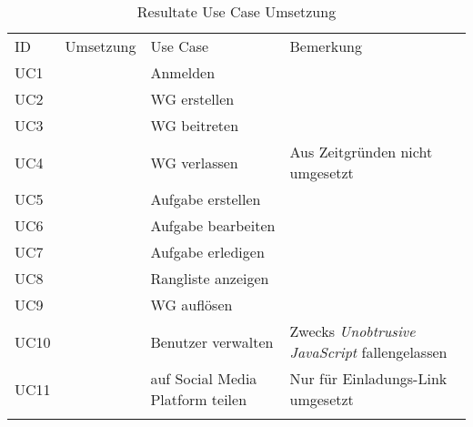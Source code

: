 \begin{table}[H]
	\tablestyle
	\tablealtcolored
	\begin{tabularx}{\textwidth}{l c l X}
		\tableheadcolor
		\tablehead ID &
		\tablehead Umsetzung &
		\tablehead Use Case &
		\tablehead Bemerkung \tabularnewline
		\tablebody
			UC1 & \faOk & Anmelden &  \tabularnewline
			UC2 & \faOk & WG erstellen &  \tabularnewline
			UC3 & \faOk & WG beitreten &  \tabularnewline
			UC4 & \faExclamation & WG verlassen & Aus Zeitgründen nicht umgesetzt \tabularnewline
			UC5 & \faOk & Aufgabe erstellen &  \tabularnewline
			UC6 & \faOk & Aufgabe bearbeiten &  \tabularnewline
			UC7 & \faOk & Aufgabe erledigen &  \tabularnewline
			UC8 & \faOk & Rangliste anzeigen &  \tabularnewline
			UC9 & \faOk & WG auflösen &  \tabularnewline
			UC10 & \faExclamation & Benutzer verwalten & Zwecks \emph{Unobtrusive JavaScript} fallengelassen \tabularnewline
			UC11 & \faExclamation & auf Social Media Platform teilen & Nur für Einladungs-Link umgesetzt \tabularnewline
		\tableend
	\end{tabularx}
	\caption{Resultate Use Case Umsetzung}
	\label{tab:useCaseResults}
\end{table}